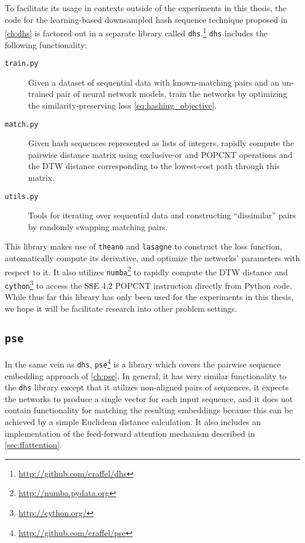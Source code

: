 To facilitate its usage in contexts outside of the experiments in this thesis, the code for the learning-based downsampled hash sequence technique proposed in \cref{ch:dhs} is factored out in a separate library called \texttt{dhs}.\footnote{\url{http://github.com/craffel/dhs}}
\texttt{dhs} includes the following functionality:
\begin{description}
\item[\texttt{train.py}] Given a dataset of sequential data with known-matching pairs and an un-trained pair of neural network models, train the networks by optimizing the similarity-preserving loss \cref{eq:hashing_objective}.
\item[\texttt{match.py}] Given hash sequences represented as lists of integers, rapidly compute the pairwise distance matrix using exclusive-or and POPCNT operations and the DTW distance corresponding to the lowest-cost path through this matrix.
\item[\texttt{utils.py}] Tools for iterating over sequential data and constructing ``dissimilar'' pairs by randomly swapping matching pairs.
\end{description}
This library makes use of \texttt{theano} \cite{bergstra2010theano,bastien2012theano} and \texttt{lasagne} \cite{dieleman2015lasagne} to construct the loss function, automatically compute its derivative, and optimize the networks' parameters with respect to it.
It also utilizes \texttt{numba}\footnote{\url{http://numba.pydata.org}} to rapidly compute the DTW distance and \texttt{cython}\footnote{\url{http://cython.org/}} to access the SSE 4.2 POPCNT instruction directly from Python code.
While thus far this library has only been used for the experiments in this thesis, we hope it will be facilitate research into other problem settings.

\subsection{\texttt{pse}}

In the same vein as \texttt{dhs}, \texttt{pse}\footnote{\url{http://github.com/craffel/pse}} is a library which covers the pairwise sequence embedding approach of \cref{ch:pse}.
In general, it has very similar functionality to the \texttt{dhs} library except that it utilizes non-aligned pairs of sequences, it expects the networks to produce a single vector for each input sequence, and it does not contain functionality for matching the resulting embeddings because this can be achieved by a simple Euclidean distance calculation.
It also includes an implementation of the feed-forward attention mechanism described in \cref{sec:ffattention}.

